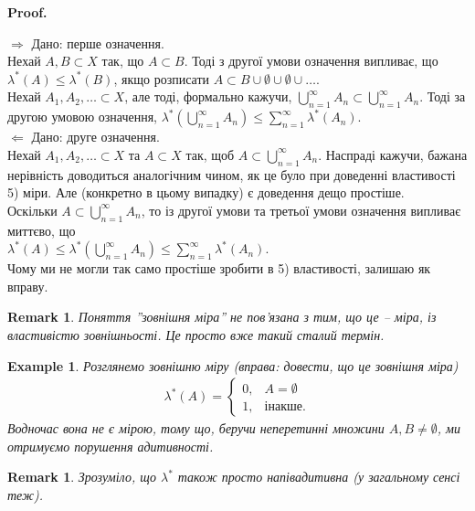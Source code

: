 \documentclass[a4paper, 10pt]{article}
\makeatletter
\def\rightproof{$\boxed{\Rightarrow}$ }
\def\leftproof{$\boxed{\Leftarrow}$ }
\theoremstyle{theoremdd}
\newtheorem{example}[theorem]{Example}
\newtheorem{remark}[theorem]{Remark}
\renewenvironment{proof}[1][Proof.\\]{\par
\pushQED{\hfill \qed}%
\normalfont \topsep6\p@\@plus6\p@\relax
\trivlist
\item\relax
{\bfseries
#1\@addpunct{.}}\hspace\labelsep\ignorespaces
}{%
\popQED\endtrivlist\@endpefalse
}
\makeatother
\begin{document}
\begin{proof}
\rightproof Дано: перше означення. \\
Нехай $A,B \subset X$ так, що $A \subset B$. Тоді з другої умови означення випливає, що $\lambda^*(A) \leq \lambda^*(B)$, якщо розписати $A \subset B \cup \emptyset \cup \emptyset \cup \dots$.\\
Нехай $A_1,A_2,\dots \subset X$, але тоді, формально кажучи, $\displaystyle\bigcup_{n=1}^\infty A_n \subset \displaystyle\bigcup_{n=1}^\infty A_n$. Тоді за другою умовою означення, $\displaystyle\lambda^*\left(\bigcup_{n=1}^\infty A_n\right) \leq \sum_{n=1}^\infty \lambda^*(A_n)$.
\bigskip \\
\leftproof Дано: друге означення.\\
Нехай $A_1,A_2,\dots \subset X$ та $A \subset X$ так, щоб $A \subset \displaystyle\bigcup_{n=1}^\infty A_n$. Наспраді кажучи, бажана нерівність доводиться аналогічним чином, як це було при доведенні властивості 5) міри. Але (конкретно в цьому випадку) є доведення дещо простіше.\\
Оскільки $A \subset \displaystyle\bigcup_{n=1}^\infty A_n$, то із другої умови та третьої умови означення випливає миттєво, що \\ $\displaystyle\lambda^*(A) \leq \lambda^*\left( \bigcup_{n=1}^\infty A_n \right) \leq \sum_{n=1}^\infty \lambda^*(A_n)$.\\
Чому ми не могли так само простіше зробити в 5) властивості, залишаю як вправу.
\end{proof}

\begin{remark}
Поняття ''зовнішня міра'' не пов'язана з тим, що це -- міра, із властивістю зовнішньості. Це просто вже такий сталий термін.
\end{remark}

\begin{example}
Розглянемо зовнішню міру (\textit{вправа: довести, що це зовнішня міра})
\begin{align*}
\lambda^*(A) = \begin{cases} 0, & A = \emptyset \\ 1, & \text{інакше}. \end{cases}
\end{align*}
Водночас вона не є мірою, тому що, беручи неперетинні множини $A,B \neq \emptyset$, ми отримуємо порушення адитивності.
\end{example}

\begin{remark}
Зрозуміло, що $\lambda^*$ також просто напівадитивна (у загальному сенсі теж).
\end{remark}
\end{document}
